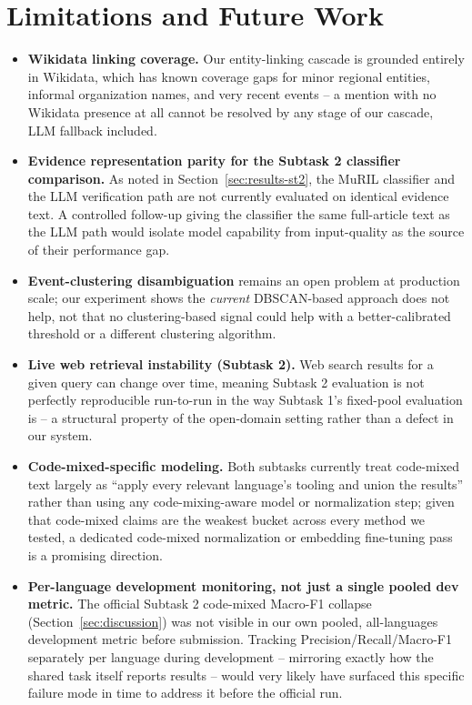 \documentclass[
]{ceurart}
\begin{document}
\section{Limitations and Future Work}
\label{sec:future-work}

\begin{itemize}
  \item \textbf{Wikidata linking coverage.} Our entity-linking cascade
    is grounded entirely in Wikidata, which has known coverage gaps for
    minor regional entities, informal organization names, and very
    recent events -- a mention with no Wikidata presence at all cannot
    be resolved by any stage of our cascade, LLM fallback included.
  \item \textbf{Evidence representation parity for the Subtask 2
    classifier comparison.} As noted in Section~\ref{sec:results-st2},
    the MuRIL classifier and the LLM verification path are not
    currently evaluated on identical evidence text. A controlled
    follow-up giving the classifier the same full-article text as the
    LLM path would isolate model capability from input-quality as the
    source of their performance gap.
  \item \textbf{Event-clustering disambiguation} remains an open
    problem at production scale; our experiment shows the
    \emph{current} DBSCAN-based approach does not help, not that no
    clustering-based signal could help with a better-calibrated
    threshold or a different clustering algorithm.
  \item \textbf{Live web retrieval instability (Subtask 2).} Web search
    results for a given query can change over time, meaning Subtask 2
    evaluation is not perfectly reproducible run-to-run in the way
    Subtask 1's fixed-pool evaluation is -- a structural property of
    the open-domain setting rather than a defect in our system.
  \item \textbf{Code-mixed-specific modeling.} Both subtasks currently
    treat code-mixed text largely as ``apply every relevant language's
    tooling and union the results'' rather than using any
    code-mixing-aware model or normalization step; given that
    code-mixed claims are the weakest bucket across every method we
    tested, a dedicated code-mixed normalization or embedding
    fine-tuning pass is a promising direction.
  \item \textbf{Per-language development monitoring, not just a single
    pooled dev metric.} The official Subtask 2 code-mixed Macro-F1
    collapse (Section~\ref{sec:discussion}) was not visible in our own
    pooled, all-languages development metric before submission.
    Tracking Precision/Recall/Macro-F1 separately per language during
    development -- mirroring exactly how the shared task itself reports
    results -- would very likely have surfaced this specific failure
    mode in time to address it before the official run.
\end{itemize}
\end{document}
